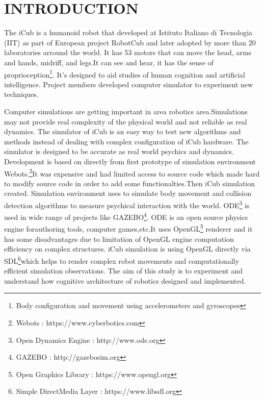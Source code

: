 \documentclass[a4paper, 11pt]{report}
\begin{document}
\chapter{INTRODUCTION}
The iCub is a humanoid robot that developed at Istituto Italiano di 
Tecnologia (IIT) as part of European project RobotCub and later adopted by 
more 
than 20 laboratories arround the world. It has 53 motors that can move the 
head, arms and hands, midriff, and legs.It can see and hear, it has the sense 
of proprioception\footnote{Body configuration and movement using accelerometers 
and gyroscopes}. It’s designed to aid studies of human cognition and artificial 
intelligence. Project members developed computer simulator to experiment new 
techniques.\par 
Computer simulations are getting important in area robotics area.Simulations 
may not provide real complexity of the physical world and 
not reliable as real dynamics. The simulator of iCub is an easy way to test 
new algorithms and methods instead of dealing with complex configuration of 
iCub hardware. The simulator is designed to be accurate as real world 
psychics and dynamics. Development is based on directly from first prototype 
of simulation environment Webots.\footnote{Webots : 
  https://www.cyberbotics.com}It was 
expensive and had limited access to source code which made hard to modify 
source code in order to add some functionalties.Then iCub simulation created. 
Simulation environment uses \linebreak to simulate body 
movement and collision detection algorithms to measure psychical interaction 
with the world. ODE\footnote{Open Dynamics Engine : http://www.ode.org} is 
used in wide range of projects like GAZEBO\footnote{GAZEBO : 
  http://gazebosim.org}. ODE is an open source physics engine forauthoring 
  tools, 
computer games,etc.It uses OpenGL\footnote{Open Graphics Library : 
  https://www.opengl.org} renderer and it has some disadvantages due to 
limitation of OpenGL engine computation efficiency on complex structures. 
iCub 
simulation is using OpenGL directly via SDL\footnote{Simple DirectMedia Layer 
: 
  https://www.libsdl.org}which helps to render complex robot movements and 
computationally efficient simulation observations. The aim of this study is to 
experiment and understand how cognitive architecture of robotics designed and 
implemented. 
\end{document}
